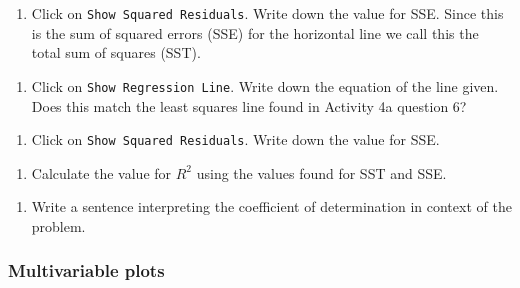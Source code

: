 \documentclass[
]{report}
\providecommand{\tightlist}{%
  \setlength{\itemsep}{0pt}\setlength{\parskip}{0pt}}
\begin{document}
\vspace{1in}

\begin{enumerate}
\def\labelenumi{\arabic{enumi}.}
\setcounter{enumi}{8}
\tightlist
\item
  Click on \texttt{Show\ Squared\ Residuals}. Write down the value for SSE. Since this is the sum of squared errors (SSE) for the horizontal line we call this the total sum of squares (SST).
\end{enumerate}

\vspace{0.5in}

\begin{enumerate}
\def\labelenumi{\arabic{enumi}.}
\setcounter{enumi}{9}
\tightlist
\item
  Click on \texttt{Show\ Regression\ Line}. Write down the equation of the line given. Does this match the least squares line found in Activity 4a question 6?
\end{enumerate}

\vspace{1in}

\begin{enumerate}
\def\labelenumi{\arabic{enumi}.}
\setcounter{enumi}{10}
\tightlist
\item
  Click on \texttt{Show\ Squared\ Residuals}. Write down the value for SSE.
\end{enumerate}

\vspace{0.5in}

\begin{enumerate}
\def\labelenumi{\arabic{enumi}.}
\setcounter{enumi}{11}
\tightlist
\item
  Calculate the value for \(R^2\) using the values found for SST and SSE.
\end{enumerate}

\vspace{1in}

\begin{enumerate}
\def\labelenumi{\arabic{enumi}.}
\setcounter{enumi}{12}
\tightlist
\item
  Write a sentence interpreting the coefficient of determination in context of the problem.
\end{enumerate}

\newpage

\hypertarget{multivariable-plots}{%
\subsubsection*{Multivariable plots}\label{multivariable-plots}}
\end{document}
